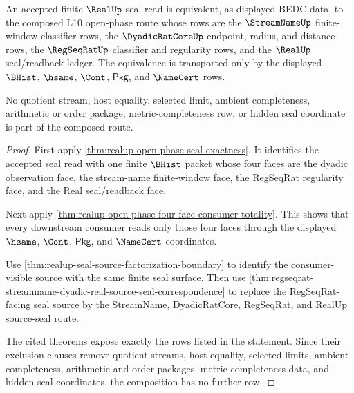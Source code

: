 \begin{theorem}
\label{thm:real-regseqrat-streamname-seal-handoff-composition}
An accepted finite $\RealUp$ seal read is equivalent, as displayed BEDC data,
to the composed L10 open-phase route whose rows are the $\StreamNameUp$
finite-window classifier rows, the $\DyadicRatCoreUp$ endpoint, radius, and
distance rows, the $\RegSeqRatUp$ classifier and regularity rows, and the
$\RealUp$ seal/readback ledger. The equivalence is transported only by the
displayed $\BHist$, $\hsame$, $\Cont$, $\mathsf{Pkg}$, and $\NameCert$ rows.

No quotient stream, host equality, selected limit, ambient completeness,
arithmetic or order package, metric-completeness row, or hidden seal coordinate
is part of the composed route.
\end{theorem}
\begin{proof}
First apply \autoref{thm:realup-open-phase-seal-exactness}. It identifies the
accepted seal read with one finite $\BHist$ packet whose four faces are the
dyadic observation face, the stream-name finite-window face, the RegSeqRat
regularity face, and the Real seal/readback face.

Next apply \autoref{thm:realup-open-phase-four-face-consumer-totality}. This
shows that every downstream consumer reads only those four faces through the
displayed $\hsame$, $\Cont$, $\mathsf{Pkg}$, and $\NameCert$ coordinates.

Use \autoref{thm:realup-seal-source-factorization-boundary} to identify the
consumer-visible source with the same finite seal surface. Then use
\autoref{thm:regseqrat-streamname-dyadic-real-source-seal-correspondence} to
replace the RegSeqRat-facing seal source by the StreamName, DyadicRatCore,
RegSeqRat, and RealUp source-seal route.

The cited theorems expose exactly the rows listed in the statement. Since their
exclusion clauses remove quotient streams, host equality, selected limits,
ambient completeness, arithmetic and order packages, metric-completeness data,
and hidden seal coordinates, the composition has no further row.
\end{proof}


